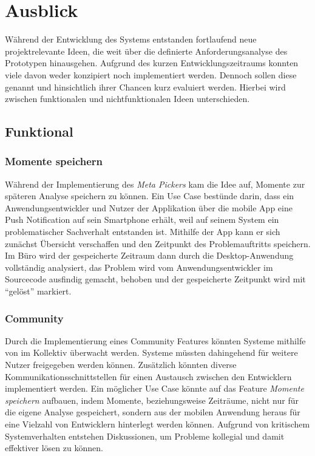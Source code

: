 \section{Ausblick}

Während der Entwicklung des Systems entstanden fortlaufend neue projektrelevante Ideen,
die weit über die definierte Anforderungsanalyse des Prototypen hinausgehen.
Aufgrund des kurzen Entwicklungszeitraums konnten viele davon weder konzipiert noch implementiert werden.
Dennoch sollen diese genannt und hinsichtlich ihrer Chancen kurz evaluiert werden.
Hierbei wird zwischen funktionalen und nichtfunktionalen Ideen unterschieden.

\subsection{Funktional}

\subsubsection{Momente speichern}

Während der Implementierung des \emph{Meta Pickers} kam die Idee auf, Momente zur späteren Analyse speichern zu können.
Ein Use Case bestünde darin, dass ein Anwendungsentwickler und Nutzer der Applikation \projectname{}
über die mobile App eine Push Notification auf sein Smartphone erhält, weil auf seinem System ein problematischer Sachverhalt
entstanden ist. Mithilfe der App kann er sich zunächst Übersicht verschaffen und den Zeitpunkt des Problemauftritts speichern.
Im Büro wird der gespeicherte Zeitraum dann durch die Desktop-Anwendung vollständig analysiert,
das Problem wird vom Anwendungsentwickler im Sourcecode ausfindig gemacht, behoben und der gespeicherte Zeitpunkt wird mit ``gelöst'' markiert.

\subsubsection{Community}

Durch die Implementierung eines Community Features könnten Systeme mithilfe von \projectname{} im Kollektiv überwacht werden.
Systeme müssten dahingehend für weitere Nutzer freigegeben werden können.
Zusätzlich könnten diverse Kommunikationsschnittstellen für einen
Austausch zwischen den Entwicklern implementiert werden. Ein möglicher Use Case könnte auf das Feature
\emph{Momente speichern} aufbauen,
indem Momente, beziehungsweise Zeiträume, nicht nur für die eigene Analyse gespeichert, sondern aus der mobilen Anwendung heraus
für eine Vielzahl von Entwicklern hinterlegt werden können.
Aufgrund von kritischem Systemverhalten entstehen Diskussionen, um Probleme kollegial und damit effektiver lösen zu können.

